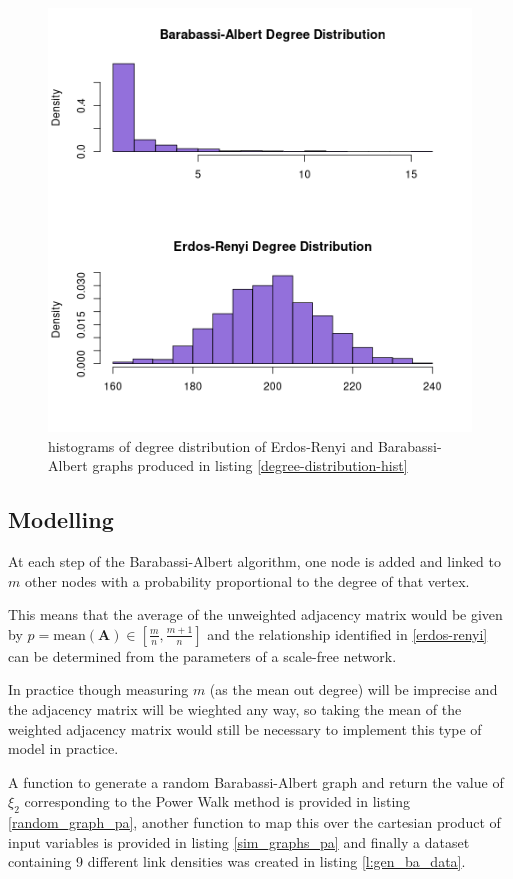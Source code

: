 \documentclass[11pt]{article}
\begin{document}
\begin{figure}[htbp]
\centering
\includegraphics[width=12cm]{media/degree_dist_er_ba.png}
\caption{\label{fig:degree-distribution-hist}histograms of degree distribution of Erdos-Renyi and Barabassi-Albert graphs produced in listing \ref{degree-distribution-hist}}
\end{figure}

\subsection{Modelling}
\label{sec:orgead89f8}
At each step of the Barabassi-Albert algorithm, one node is added and linked to \(m\) other nodes with a probability proportional to the degree of that vertex.

This means that the average of the unweighted adjacency matrix would be given by \(p = \mathrm{mean}\left(\mathbf{A}\right) \in \left[ \frac{m}{n}, \frac{m+1}{n} \right]\) and the relationship identified in \ref{erdos-renyi} can be determined from the parameters of a scale-free network.

In practice though measuring \(m\) (as the mean out degree) will be imprecise and the adjacency matrix will be wieghted any way, so taking the mean of the weighted adjacency matrix would still be necessary to implement this type of model in practice.

A function to generate a random Barabassi-Albert graph and return the value of
\(\xi_{2}\) corresponding to the Power Walk method is provided in listing
\ref{random_graph_pa}, another function to map this over the cartesian product of
input variables is provided in listing \ref{sim_graphs_pa} and finally a dataset containing 9
different link densities was created in listing \ref{l:gen_ba_data}.
\end{document}
